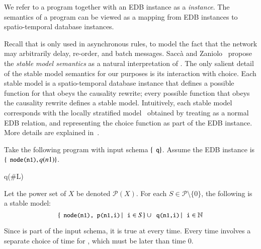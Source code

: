 
We refer to a \lang program together with an EDB instance as a {\em \lang instance}.  The semantics of a \lang program can be viewed as a mapping from EDB instances to spatio-temporal database instances.

Recall that  is only used in asynchronous rules, to model the fact that the network may arbitrarily delay, re-order, and batch messages.
Sacc\`{a} and Zaniolo~\cite{sacca-zaniolo} propose the {\em stable model semantics} as a natural interpretation of .  The only salient detail of the stable model semantics for our purposes is its interaction with choice.  Each stable model is a spatio-temporal database instance that defines a possible function for  that obeys the causality rewrite; every possible function that obeys the causality rewrite defines a stable model.  Intuitively, each stable model corresponds with the locally stratified model~\cite{stable-model} obtained by treating  as a normal EDB relation, and representing the choice function as part of the EDB instance.  More details are explained in~\cite{ameloot-operational}.

\begin{example}
\label{ex:infinitemodels}
Take the following \lang program with input schema $\{\dedalus{q}\}$.  Assume the EDB instance is $\{\dedalus{node(n1)}, q(n1)\}$.

\begin{Drules}
        {q(#L)}
\end{Drules}

Let the power set of $X$ be denoted $\mathcal{P}(X)$.  For each $S \in \mathcal{P \setminus \{0\}}$, the following is a stable model:
$$\{\dedalus{node(n1), p(n1,i)} \, | \, \dedalus{i} \in S \} \cup {\dedalus{q(n1,i)} \, | \, \dedalus{i} \in \mathbb{N}}$$


Since  is part of the input schema, it is true at every time.  Every time involves a separate choice of time for , which must be later than time 0.
\end{example}

